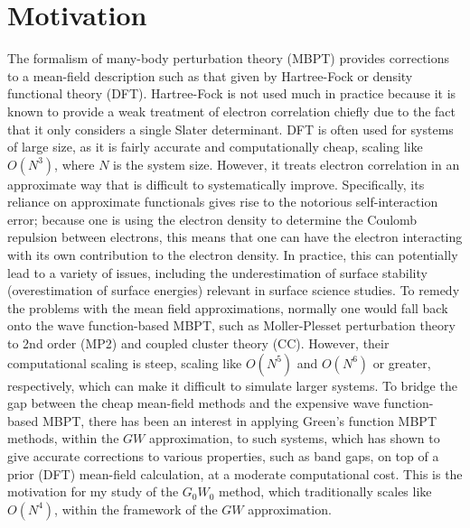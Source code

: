 \documentclass[12pt]{caltech_thesis}
\begin{document}
\chapter{Motivation}
The formalism of many-body perturbation theory (MBPT) provides corrections to a mean-field description such as that given by Hartree-Fock or density functional theory (DFT). Hartree-Fock is not used much in practice because it is known to provide a weak treatment of electron correlation chiefly due to the fact that it only considers a single Slater determinant. DFT is often used for systems of large size, as it is fairly accurate and computationally cheap, scaling like $O(N^3)$, where $N$ is the system size. However, it treats electron correlation in an approximate way that is difficult to systematically improve. Specifically, its reliance on approximate functionals gives rise to the notorious self-interaction error; because one is using the electron density to determine the Coulomb repulsion between electrons, this means that one can have the electron interacting with its own contribution to the electron density. In practice, this can potentially lead to a variety of issues, including the underestimation of surface stability (overestimation of surface energies) relevant in surface science studies. \autocite{schimka_accurate_2010} \autocite{kozlowski_elucidating_2021} To remedy the problems with the mean field approximations, normally one would fall back onto the wave function-based MBPT, such as Moller-Plesset perturbation theory to 2nd order (MP2) and coupled cluster theory (CC). However, their computational scaling is steep, scaling like $O(N^5)$ and $O(N^6)$ or greater, respectively, which can make it difficult to simulate larger systems. \autocite{mcclain_gaussian-based_2017} To bridge the gap between the cheap mean-field methods and the expensive wave function-based MBPT, there has been an interest in applying Green's function MBPT methods, within the $GW$ approximation, to such systems, which has shown to give accurate corrections to various properties, such as band gaps, on top of a prior (DFT) mean-field calculation, at a moderate computational cost. \autocite{noauthor_frontiers_nodate} This is the motivation for my study of the $G_0W_0$ method, which traditionally scales like $O(N^4)$, within the framework of the $GW$ approximation.
\end{document}
